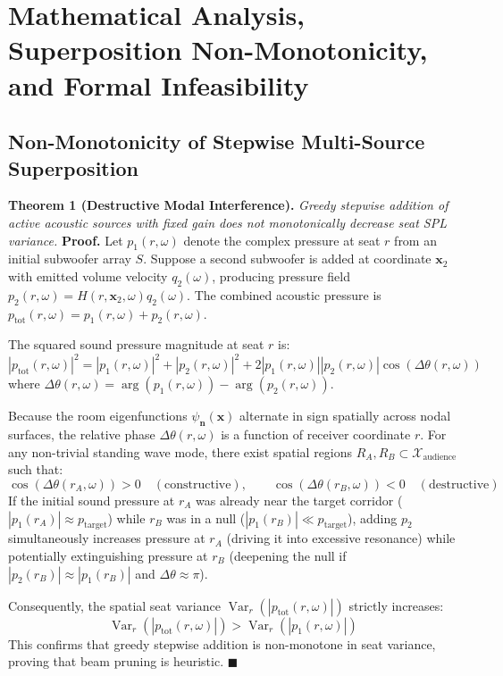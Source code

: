 \documentclass[11pt,a4paper,titlepage]{article}
\newenvironment{proof}{\noindent\textbf{Proof.}}{\hfill$\blacksquare$\vspace{0.5em}\par}
\begin{document}
\section{Mathematical Analysis, Superposition Non-Monotonicity, and Formal Infeasibility}
\label{app:proofs}

\subsection{Non-Monotonicity of Stepwise Multi-Source Superposition}
\noindent \textbf{Theorem 1 (Destructive Modal Interference).} \textit{Greedy stepwise addition of active acoustic sources with fixed gain does not monotonically decrease seat SPL variance.}
\begin{proof}
Let $p_1(r, \omega)$ denote the complex pressure at seat $r$ from an initial subwoofer array $S$. Suppose a second subwoofer is added at coordinate $\mathbf{x}_2$ with emitted volume velocity $q_2(\omega)$, producing pressure field $p_2(r, \omega) = H(r, \mathbf{x}_2, \omega) q_2(\omega)$. The combined acoustic pressure is $p_{\text{tot}}(r, \omega) = p_1(r, \omega) + p_2(r, \omega)$.

The squared sound pressure magnitude at seat $r$ is:
\begin{equation}
    |p_{\text{tot}}(r, \omega)|^2 = |p_1(r, \omega)|^2 + |p_2(r, \omega)|^2 + 2 |p_1(r, \omega)| |p_2(r, \omega)| \cos(\Delta \theta(r, \omega))
\end{equation}
where $\Delta \theta(r, \omega) = \arg(p_1(r, \omega)) - \arg(p_2(r, \omega))$.

Because the room eigenfunctions $\psi_{\mathbf{n}}(\mathbf{x})$ alternate in sign spatially across nodal surfaces, the relative phase $\Delta \theta(r, \omega)$ is a function of receiver coordinate $r$. For any non-trivial standing wave mode, there exist spatial regions $R_A, R_B \subset \mathcal{X}_{\text{audience}}$ such that:
\begin{equation}
    \cos(\Delta \theta(r_A, \omega)) > 0 \quad (\text{constructive}), \qquad \cos(\Delta \theta(r_B, \omega)) < 0 \quad (\text{destructive})
\end{equation}
If the initial sound pressure at $r_A$ was already near the target corridor ($|p_1(r_A)| \approx p_{\text{target}}$) while $r_B$ was in a null ($|p_1(r_B)| \ll p_{\text{target}}$), adding $p_2$ simultaneously increases pressure at $r_A$ (driving it into excessive resonance) while potentially extinguishing pressure at $r_B$ (deepening the null if $|p_2(r_B)| \approx |p_1(r_B)|$ and $\Delta \theta \approx \pi$). 

Consequently, the spatial seat variance $\operatorname{Var}_r(|p_{\text{tot}}(r, \omega)|)$ strictly increases:
\begin{equation}
    \operatorname{Var}_r(|p_{\text{tot}}(r, \omega)|) > \operatorname{Var}_r(|p_1(r, \omega)|)
\end{equation}
This confirms that greedy stepwise addition is non-monotone in seat variance, proving that beam pruning is heuristic.
\end{proof}
\end{document}
